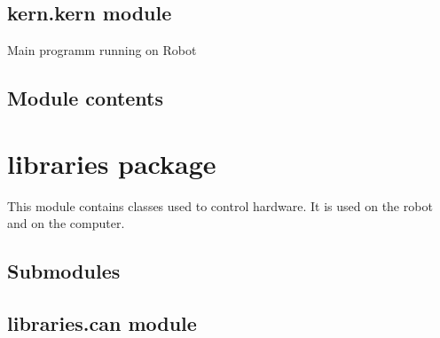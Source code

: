 \documentclass[letterpaper,10pt,english]{sphinxmanual}
\begin{document}
\section{kern.kern module}
\label{kern:module-kern.kern}\label{kern:kern-kern-module}

\begin{fulllineitems}
\label{kern:kern.kern.main}
Main programm running on Robot

\end{fulllineitems}



\section{Module contents}
\label{kern:module-kern}\label{kern:module-contents}

\chapter{libraries package}
\label{libraries::doc}\label{libraries:libraries-package}
This module contains classes used to control hardware. It is used on the robot and on the computer.


\section{Submodules}
\label{libraries:submodules}

\section{libraries.can module}
\label{libraries:libraries-can-module}
\end{document}
